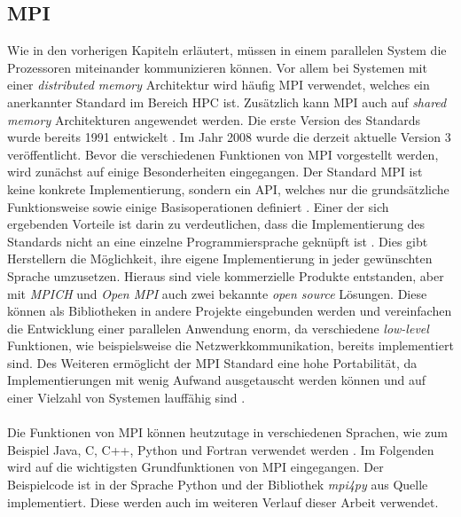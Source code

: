 \subsection{MPI}
\label{subsec:mpi}
Wie in den vorherigen Kapiteln erläutert, müssen in einem parallelen System die Prozessoren miteinander kommunizieren können. Vor allem bei Systemen mit einer \emph{distributed memory} Architektur wird häufig \ac{MPI} verwendet, welches ein anerkannter Standard im Bereich \ac{HPC} ist. Zusätzlich kann \ac{MPI} auch auf \emph{shared memory} Architekturen angewendet werden. Die erste Version des Standards wurde bereits 1991 entwickelt \cite{nielsen2016introduction}. Im Jahr 2008 wurde die derzeit aktuelle Version 3 veröffentlicht. Bevor die verschiedenen Funktionen von \ac{MPI} vorgestellt werden, wird zunächst auf einige Besonderheiten eingegangen. Der Standard \ac{MPI} ist keine konkrete Implementierung, sondern ein \ac{API}, welches nur die grundsätzliche Funktionsweise sowie einige Basisoperationen definiert \cite{nielsen2016introduction}. Einer der sich ergebenden Vorteile ist darin zu verdeutlichen, dass die Implementierung des Standards nicht an eine einzelne Programmiersprache geknüpft ist \cite{nielsen2016introduction}. Dies gibt Herstellern die Möglichkeit, ihre eigene Implementierung in jeder gewünschten Sprache umzusetzen. Hieraus sind viele kommerzielle Produkte entstanden, aber mit \emph{MPICH} und \emph{Open MPI} auch zwei bekannte \emph{open source} Lösungen. Diese können als Bibliotheken in andere Projekte eingebunden werden und vereinfachen die Entwicklung einer parallelen Anwendung enorm, da verschiedene \emph{low-level} Funktionen, wie beispielsweise die Netzwerkkommunikation, bereits implementiert sind. Des Weiteren ermöglicht der \ac{MPI} Standard eine hohe Portabilität, da Implementierungen mit wenig Aufwand ausgetauscht werden können und auf einer Vielzahl von Systemen lauffähig sind \cite{dalcin2008mpi}.
\\\\
Die Funktionen von \ac{MPI} können heutzutage in verschiedenen Sprachen, wie zum Beispiel Java, C, C++, Python und Fortran verwendet werden \cite{nielsen2016introduction}. Im Folgenden wird auf die wichtigsten Grundfunktionen von \ac{MPI} eingegangen. Der Beispielcode ist in der Sprache Python und der Bibliothek \emph{mpi4py} aus Quelle \cite{dalcin2008mpi} implementiert. Diese werden auch im weiteren Verlauf dieser Arbeit verwendet.
